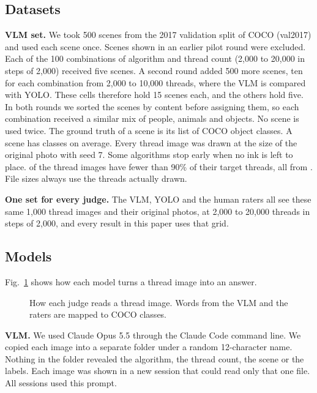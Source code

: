 \documentclass[conference]{IEEEtran}
\let\LaTeXcaption\caption
\let\caption\LaTeXcaption
\providecommand{\ShortImages}{}\providecommand{\ShortTotal}{}\providecommand{\ShortAlgos}{}
\begin{document}
\subsection{Datasets}
\label{sec:data}

\textbf{VLM set.} We took 500 scenes from the 2017 validation split of COCO (val2017) and used each scene once. Scenes shown in an earlier pilot round were excluded. Each of the 100 combinations of algorithm and thread count (2,000 to 20,000 in steps of 2,000) received five scenes. A second round added 500 more scenes, ten for each combination from 2,000 to 10,000 threads, where the VLM is compared with YOLO. These cells therefore hold 15 scenes each, and the others hold five. In both rounds we sorted the scenes by content before assigning them, so each combination received a similar mix of people, animals and objects. No scene is used twice. The ground truth of a scene is its list of COCO object classes. A scene has \NumClassesPerImage{} classes on average. Every thread image was drawn at the size of the original photo with seed 7. Some algorithms stop early when no ink is left to place. \ShortImages{} of the \ShortTotal{} thread images have fewer than 90\% of their target threads, all from \ShortAlgos{}. File sizes always use the threads actually drawn.

\textbf{One set for every judge.} The VLM, YOLO and the human raters all see these same 1,000 thread images and their original photos, at 2,000 to 20,000 threads in steps of 2,000, and every result in this paper uses that grid.

\subsection{Models}
\label{sec:models}

Fig.~\ref{fig:models} shows how each model turns a thread image into an answer.

\begin{figure}[t]
\centering
\resizebox{0.85\textwidth}{!}{}
\caption{How each judge reads a thread image. Words from the VLM and the raters are mapped to COCO classes.}
\label{fig:models}
\end{figure}

\textbf{VLM.} We used Claude Opus 5.5 \cite{anthropic2026} through the Claude Code command line. We copied each image into a separate folder under a random 12-character name. Nothing in the folder revealed the algorithm, the thread count, the scene or the labels. Each image was shown in a new session that could read only that one file. All sessions used this prompt.
\end{document}
